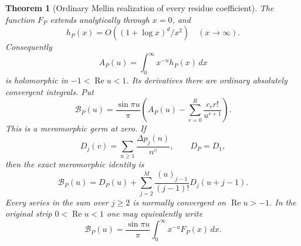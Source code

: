 \documentclass[11pt,letterpaper]{article}
\newtheorem{theorem}{Theorem}[section]
\theoremstyle{definition}
\theoremstyle{remark}
\numberwithin{equation}{section}
\begin{document}
\begin{theorem}[Ordinary Mellin realization of every residue coefficient]
\label{mellin:main}
The function $F_P$ extends analytically through $x=0$, and
\[
 h_P(x)=O((1+\log x)^d/x^2)\quad(x\longrightarrow\infty).
\]
Consequently
\begin{equation}\label{mellin:A}
 A_P(u)=\int_0^\infty x^{-u}h_P(x)\,dx
\end{equation}
is holomorphic in $-1<\operatorname{Re}u<1$.  Its derivatives there
are ordinary absolutely convergent integrals.  Put
\begin{equation}\label{mellin:B}
 \mathcal B_P(u)=\frac{\sin\pi u}{\pi}
 \left(A_P(u)-\sum_{r=0}^{R}\frac{c_r r!}{u^{r+1}}\right).
\end{equation}
This is a meromorphic germ at zero.  If
\[
 D_j(v)=\sum_{n\ge1}\frac{\Delta p_j(n)}{n^v},\qquad D_P=D_1,
\]
then the exact meromorphic identity is
\begin{equation}\label{mellin:bridge}
 \boxed{\mathcal B_P(u)=D_P(u)+
 \sum_{j=2}^{M}\frac{(u)_{j-1}}{(j-1)!}D_j(u+j-1).}
\end{equation}
Every series in the sum over $j\ge2$ is normally convergent on
$\operatorname{Re}u>-1$.  In the original strip
$0<\operatorname{Re}u<1$ one may equivalently write
\begin{equation}\label{mellin:unsubtracted}
 \mathcal B_P(u)=\frac{\sin\pi u}{\pi}
                  \int_0^\infty x^{-u}F_P(x)\,dx.
\end{equation}
\end{theorem}
\end{document}
